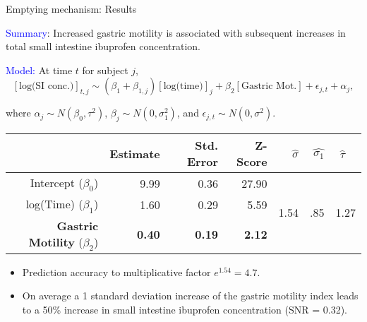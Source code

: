 \documentclass[]{beamer}
\begin{document}
\begin{frame}{Emptying mechanism: Results}

\textcolor{blue}{Summary}: Increased gastric motility is associated with subsequent increases in total small intestine ibuprofen concentration.

\pause

\bigskip

\small
\textcolor{blue}{Model:} At time $t$ for subject $j$, $$[\text{log(SI conc.)}]_{t,j} \sim (\beta_1 + \beta_{1,j})[\text{log(time)}]_j + \beta_2[\text{Gastric Mot.}] + \epsilon_{j,t} + \alpha_j,$$

where $\alpha_j \sim N(\beta_0, \tau^2)$, $\beta_j \sim N(0, \sigma_1^2)$, and $\epsilon_{j,t} \sim N(0, \sigma^2)$.%

\footnotesize
\begin{table}[ht]
\centering
\begin{tabular}{rrrr||rrr}
  \hline
 & Estimate & Std. Error & Z-Score & $\hat{\sigma}$ & $\hat{\sigma_1}$ & $\hat{\tau}$ \ \\ 
  \hline
Intercept ($\beta_0$) & 9.99 & 0.36 & 27.90 & \multirow{3}{*}{1.54}& \multirow{3}{*}{.85}& \multirow{3}{*}{1.27}\\ 
  log(Time) ($\beta_1$) & 1.60 & 0.29 & 5.59 & & &\\ 
  {\bf Gastric Motility} ($\beta_2$) & {\bf 0.40} & {\bf 0.19} & {\bf 2.12} & & & \\ 
   \hline
\end{tabular}
\end{table}

\small
\begin{itemize}
	\item Prediction accuracy to multiplicative factor $e^{1.54} = 4.7$.
	\item On average a 1 standard deviation increase of the gastric motility index leads to a 50\% increase in small intestine ibuprofen concentration (SNR = 0.32).
\end{itemize}

\end{frame}
\end{document}
